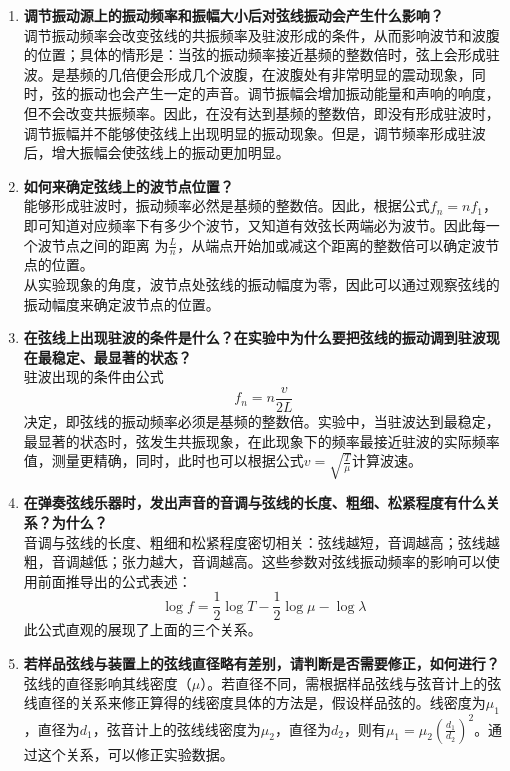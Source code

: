 \documentclass[zihao=5, UTF8]{article}
\theoremstyle{MyLineTheoremStyle} %
\theoremstyle{MyBlockTheoremStyle} %
\theoremstyle{MySubsubsectionStyle} %
\begin{document}
\begin{enumerate}
    \item \textbf{调节振动源上的振动频率和振幅大小后对弦线振动会产生什么影响？} \\
    调节振动频率会改变弦线的共振频率及驻波形成的条件，从而影响波节和波腹的位置；具体的情形是：当弦的振动频率接近基频的整数倍时，弦上会形成驻波。是基频的几倍便会形成几个波腹，在波腹处有非常明显的震动现象，同时，弦的振动也会产生一定的声音。调节振幅会增加振动能量和声响的响度，但不会改变共振频率。因此，在没有达到基频的整数倍，即没有形成驻波时，调节振幅并不能够使弦线上出现明显的振动现象。但是，调节频率形成驻波后，增大振幅会使弦线上的振动更加明显。

    \item \textbf{如何来确定弦线上的波节点位置？} \\
    能够形成驻波时，振动频率必然是基频的整数倍。因此，根据公式$f_n = nf_1$，即可知道对应频率下有多少个波节，又知道有效弦长两端必为波节。因此每一个波节点之间的距离       为$\frac{L}{n}$，从端点开始加或减这个距离的整数倍可以确定波节点的位置。 \\
    从实验现象的角度，波节点处弦线的振动幅度为零，因此可以通过观察弦线的振动幅度来确定波节点的位置。
    \item \textbf{在弦线上出现驻波的条件是什么？在实验中为什么要把弦线的振动调到驻波现在最稳定、最显著的状态？} \\
    驻波出现的条件由公式$$f_n = n\frac{v}{2L}$$决定，即弦线的振动频率必须是基频的整数倍。实验中，当驻波达到最稳定，最显著的状态时，弦发生共振现象，在此现象下的频率最接近驻波的实际频率值，测量更精确，同时，此时也可以根据公式$v = \sqrt{\frac{T}{\mu}}$计算波速。
    \item \textbf{在弹奏弦线乐器时，发出声音的音调与弦线的长度、粗细、松紧程度有什么关系？为什么？} \\
    音调与弦线的长度、粗细和松紧程度密切相关：弦线越短，音调越高；弦线越粗，音调越低；张力越大，音调越高。这些参数对弦线振动频率的影响可以使用前面推导出的公式表述：$$\log f = \frac{1}{2} \log T - \frac{1}{2} \log \mu - \log \lambda$$ 此公式直观的展现了上面的三个关系。

    \item \textbf{若样品弦线与装置上的弦线直径略有差别，请判断是否需要修正，如何进行？} \\
    弦线的直径影响其线密度（$\mu$）。若直径不同，需根据样品弦线与弦音计上的弦线直径的关系来修正算得的线密度具体的方法是，假设样品弦的。线密度为$\mu_1$，直径为$d_1$，弦音计上的弦线线密度为$\mu_2$，直径为$d_2$，则有$\mu_1 = \mu_2 \left(\frac{d_1}{d_2}\right)^2$。通过这个关系，可以修正实验数据。


\end{enumerate}
\end{document}
